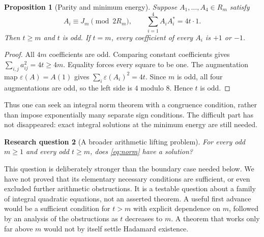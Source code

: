 \documentclass[11pt]{article}
\newtheorem{proposition}{Proposition}[section]
\newtheorem{question}[proposition]{Research question}
\begin{document}
\begin{proposition}[Parity and minimum energy]\label{prop:energy}
Suppose $A_1,\ldots,A_4\in R_m$ satisfy
\begin{equation}\label{eq:norm}
 A_i\equiv J_m\pmod{2R_m},\qquad
 \sum_{i=1}^4 A_iA_i^*=4t\cdot1.
\end{equation}
Then $t\ge m$ and $t$ is odd. If $t=m$, every coefficient of every
$A_i$ is $+1$ or $-1$.
\end{proposition}
\begin{proof}
All $4m$ coefficients are odd. Comparing constant coefficients gives
$\sum_{i,j}a_{ij}^2=4t\ge4m$. Equality forces every square to be one.
The augmentation map $\varepsilon(A)=A(1)$ gives
$\sum_i\varepsilon(A_i)^2=4t$. Since $m$ is odd, all four augmentations
are odd, so the left side is $4$ modulo $8$. Hence $t$ is odd.
\end{proof}

Thus one can seek an integral norm theorem with a congruence condition,
rather than impose exponentially many separate sign conditions.
The difficult part has not disappeared: exact integral solutions at
the minimum energy are still needed.

\begin{question}[A broader arithmetic lifting problem]\label{q:norm}
For every odd $m\ge1$ and every odd $t\ge m$, does
\eqref{eq:norm} have a solution?
\end{question}
This question is deliberately stronger than the boundary case needed
below. We have not proved that its elementary necessary conditions are
sufficient, or even excluded further arithmetic obstructions. It is a
testable question about a family of integral quadratic equations, not an
asserted theorem. A useful first advance would be a sufficient condition
for $t>m$ with explicit dependence on $m$, followed by an analysis of the
obstructions as $t$ decreases to $m$. A theorem that works only far above
$m$ would not by itself settle Hadamard existence.
\end{document}
